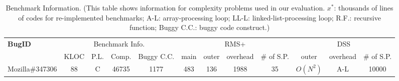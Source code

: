 \begin{table}[h!]
  \centering
  \scriptsize
  {
  \newcommand{\Yes}[1]{\checkmark{}$_#1$}
  \newcommand{\No}[0]{-}
  \begin{tabular}{lccccccccccc}
    \toprule     
    {\bf BugID}        &  \multicolumn{4}{c}{Benchmark Info.}  & \multicolumn{4}{c}{RMS+}         & \multicolumn{3}{c}{DSS}   \\
     
    \cmidrule(lr){2-5}                      
    \cmidrule(lr){6-9}
    \cmidrule(lr){10-12}
                                  &  KLOC     &  P.L.  &  Comp. &  Buggy C.C.     & main    & outer    & overhead  & \# of S.P.         &   outer        &  overhead & \# of S.P.  \\
    \midrule 

    Mozilla\#347306              &  $88$    & C        &   46735  &   1177        &  483    &  136    &  1988  & 35   &  $O(N^{2})$                         &  A-L  & 10000   &\\



    \bottomrule
   \end{tabular}
   }
  \caption{Benchmark Information.
  \footnotesize{(This table shows information for complexity problems used in our evaluation. 
   $x^*$: thousands of lines of codes for re-implemented benchmarks; 
   A-L: array-processing loop; 
   LL-L: linked-list-processing loop; 
   R.F.: recursive function; 
   Buggy C.C.: buggy code construct.)}}
  \label{tab:benchmark_info}
\end{table}